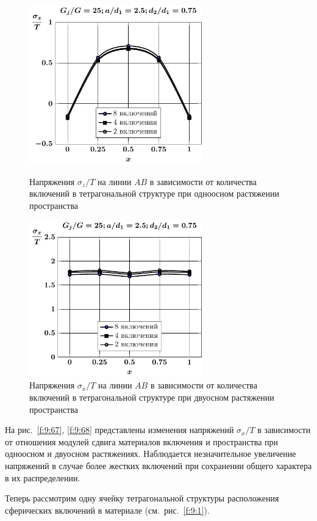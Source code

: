 \begin{figure}[h!]
\centering\footnotesize
\parbox[b]{7.5cm}{\centering\includegraphics[width=7.5cm]{inc8-4-2-a25-d75-g25-sig_z-spheroids-tension1.pdf}
\caption{Напряжения $\sigma_z/T$ на линии $AB$ в зависимости от количества включений в тетрагональной структуре при одноосном растяжении пространства
\label{f:9:19}}}\hfil\hfil
\parbox[b]{7.5cm}{\centering\includegraphics[width=7.5cm]{inc8-4-2-a25-d75-g25-sig_x-spheroids-tension2.pdf}
\caption{Напряжения $\sigma_x/T$ на линии $AB$ в зависимости от количества включений в тетрагональной структуре при двуосном растяжении пространства
\label{f:9:23}}}
\end{figure}

На рис.~\ref{f:9:67}, \ref{f:9:68} представлены изменения напряжений $\sigma_x/T$ в зависимости от отношения модулей сдвига материалов включения и пространства при одноосном и двуосном растяжениях. Наблюдается незначительное увеличение напряжений в случае более жестких включений при сохранении общего характера в их распределении.

Теперь рассмотрим одну ячейку тетрагональной структуры расположения сферических включений в материале (см.~рис.~\ref{f:9:1}).

